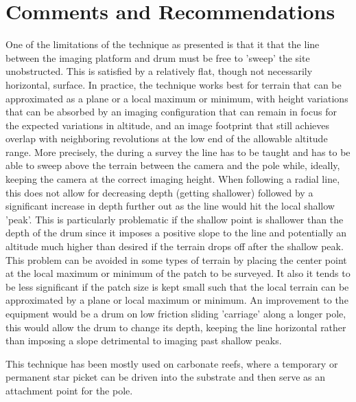 \section{Comments and Recommendations}


One of the limitations of the technique as presented is that it that the line between the imaging platform and drum must be free to 'sweep' the site unobstructed. This is satisfied by a relatively flat, though not necessarily horizontal, surface. In practice, the technique works best for terrain that can be approximated as a plane or a local maximum or minimum, with height variations that can be absorbed by an imaging configuration that can remain in focus for the expected variations in altitude, and an image footprint that still achieves overlap with neighboring revolutions at the low end of the allowable altitude range.
More precisely, the during a survey the line has to be taught and has to be able to sweep above the terrain between the camera and the pole while, ideally, keeping the camera at the correct imaging height. When following a radial line, this does not allow for decreasing depth (getting shallower) followed by a significant increase in depth further out as the line would hit the local shallow 'peak'. This is particularly problematic if the shallow point is shallower than the depth of the drum since it imposes a positive slope to the line and potentially an altitude much higher than desired if the terrain drops off after the shallow peak. This problem can be avoided in some types of terrain by placing the center point at the local maximum or minimum of the patch to be surveyed. It also it tends to be less significant if the patch size is kept small such that the local terrain can be approximated by a plane or local maximum or minimum.
An improvement to the equipment would be a drum on low friction sliding 'carriage' along a longer pole, this would allow the drum to change its depth, keeping the line horizontal rather than imposing a slope detrimental to imaging past shallow peaks.

This technique has been mostly used on carbonate reefs, where a temporary or permanent star picket can be driven into the substrate and then serve as an attachment point for the pole.